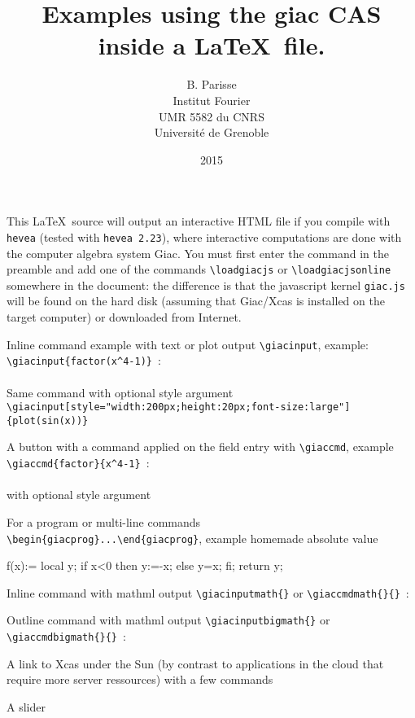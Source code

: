 \documentclass[a4paper,11pt]{article}
\title {Examples using the giac CAS inside a \LaTeX\ file.}
\author{B. Parisse\\Institut Fourier\\UMR 5582 du CNRS
\\Université de Grenoble}
\date{2015}
\begin{document}
\maketitle

This \LaTeX\ source will output an interactive HTML file if you compile
with {\tt hevea} (tested with \verb|hevea 2.23|), where interactive
computations are done with the computer algebra system Giac.
You must first enter the command \verb|| in the
preamble and add one of the commands \verb|\loadgiacjs| or \verb|\loadgiacjsonline|
somewhere in the document: the difference is that the javascript
kernel \verb|giac.js|
will be found on the hard disk (assuming that Giac/Xcas is
installed on the target computer) or downloaded from Internet.
\loadgiacjsonline

Inline command example with text or plot output \verb|\giacinput|, 
example: \verb|\giacinput{factor(x^4-1)}|~:\\
\\
Same command with optional style argument\\
\verb|\giacinput[style="width:200px;height:20px;font-size:large"]{plot(sin(x))}|\\

A button with a command applied on the field entry with
\verb|\giaccmd|, example \verb|\giaccmd{factor}{x^4-1}|~:\\
\\
with optional style argument

For a program or multi-line commands\\
\verb|\begin{giacprog}...\end{giacprog}|, example homemade absolute value\\
\begin{giacprog}
f(x):={
  local y;
  if x<0 then y:=-x; else y=x; fi;
  return y;
}
\end{giacprog}

Inline command with mathml output
\verb|\giacinputmath{}| or \verb|\giaccmdmath{}{}|~:

Outline command with mathml output
\verb|\giacinputbigmath{}| or \verb|\giaccmdbigmath{}{}|~:

A link to Xcas under the Sun (by contrast to applications in the
cloud that require more server ressources) with a few commands

A slider
\end{document}
